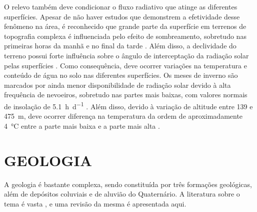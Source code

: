 O relevo também deve condicionar o fluxo radiativo que atinge as diferentes superfícies. Apesar de não haver 
estudos que demonstrem a efetividade desse fenômeno na área, é reconhecido que grande parte da superfície em 
terrenos de topografia complexa é influenciada pelo efeito de sombreamento, sobretudo nas primeiras horas da 
manhã e no final da tarde \cite{OliphantEtAl2003}. Além disso, a declividade do terreno possui forte 
influência 
sobre o ângulo de interceptação da radiação solar pelas superfícies \cite{Birkeland1999}. Como consequência, 
deve ocorrer variações na temperatura e conteúdo de água no solo nas diferentes superfícies. Os meses de 
inverno são marcados por ainda menor disponibilidade de radiação solar devido à alta frequência de nevoeiros, 
sobretudo nas partes mais baixas, com valores normais de insolação de \SI{5,1}{\hour\per\day} 
\cite{HeldweinEtAl2009}. Além disso, devido à variação de altitude entre \num{139} e \SI{475}{\metre}, deve 
ocorrer diferença na temperatura da ordem de aproximadamente \SI{4}{\celsius} entre a parte mais baixa e a 
parte mais alta \cite{HeldweinEtAl2009}.

\section{GEOLOGIA}
\label{sec:chap03-geologia}

A geologia é bastante complexa, sendo constituída por três formações geológicas, além de depósitos coluviais 
e de aluvião do Quaternário. A literatura sobre o tema é vasta \cite{Bortoluzzi1974, Brasil1980, 
GasparettoEtAl1988, MacielFilho1990, Machado1998, PieriniEtAl2002, MarquesEtAl2005, Milani2005, Pinto2005, 
CPRM2007, Pedron2007, Sartori2009, NascimentoEtAl2010, WerlangEtAl2010, PedronEtAl2012}, e uma revisão da 
mesma é apresentada aqui.


\def\caturrita{\href{https://pt.wikipedia.org/wiki/Forma\%C3\%A7\%C3\%A3o_Caturrita}{Formação Caturrita}}


